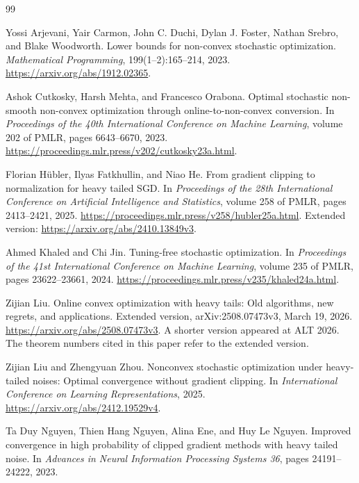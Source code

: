 \documentclass[11pt,a4paper]{article}
\theoremstyle{definition}
\theoremstyle{remark}
\begin{document}
\begin{thebibliography}{99}

Yossi Arjevani, Yair Carmon, John C. Duchi, Dylan J. Foster,
Nathan Srebro, and Blake Woodworth.
\newblock Lower bounds for non-convex stochastic optimization.
\newblock \emph{Mathematical Programming}, 199(1--2):165--214, 2023.
\newblock \url{https://arxiv.org/abs/1912.02365}.

Ashok Cutkosky, Harsh Mehta, and Francesco Orabona.
\newblock Optimal stochastic non-smooth non-convex optimization through
online-to-non-convex conversion.
\newblock In \emph{Proceedings of the 40th International Conference on
Machine Learning}, volume 202 of PMLR, pages 6643--6670, 2023.
\newblock \url{https://proceedings.mlr.press/v202/cutkosky23a.html}.

Florian H\"ubler, Ilyas Fatkhullin, and Niao He.
\newblock From gradient clipping to normalization for heavy tailed SGD.
\newblock In \emph{Proceedings of the 28th International Conference on
Artificial Intelligence and Statistics}, volume 258 of PMLR,
pages 2413--2421, 2025.
\newblock \url{https://proceedings.mlr.press/v258/hubler25a.html}.
\newblock Extended version: \url{https://arxiv.org/abs/2410.13849v3}.

Ahmed Khaled and Chi Jin.
\newblock Tuning-free stochastic optimization.
\newblock In \emph{Proceedings of the 41st International Conference on
Machine Learning}, volume 235 of PMLR, pages 23622--23661, 2024.
\newblock \url{https://proceedings.mlr.press/v235/khaled24a.html}.

Zijian Liu.
\newblock Online convex optimization with heavy tails: Old algorithms,
new regrets, and applications.
\newblock Extended version, arXiv:2508.07473v3, March 19, 2026.
\newblock \url{https://arxiv.org/abs/2508.07473v3}.
\newblock A shorter version appeared at ALT 2026. The theorem numbers
cited in this paper refer to the extended version.

Zijian Liu and Zhengyuan Zhou.
\newblock Nonconvex stochastic optimization under heavy-tailed noises:
Optimal convergence without gradient clipping.
\newblock In \emph{International Conference on Learning Representations}, 2025.
\newblock \url{https://arxiv.org/abs/2412.19529v4}.

Ta Duy Nguyen, Thien Hang Nguyen, Alina Ene, and Huy Le Nguyen.
\newblock Improved convergence in high probability of clipped gradient
methods with heavy tailed noise.
\newblock In \emph{Advances in Neural Information Processing Systems 36},
pages 24191--24222, 2023.


\end{thebibliography}
\end{document}
